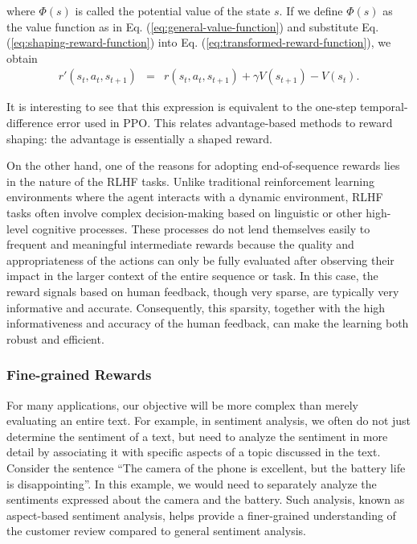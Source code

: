 \noindent where $\Phi(s)$ is called the potential value of the state $s$. If we define $\Phi(s)$ as the value function as in Eq. (\ref{eq:general-value-function}) and substitute Eq. (\ref{eq:shaping-reward-function}) into Eq. (\ref{eq:transformed-reward-function}), we obtain
\begin{eqnarray}
r'(s_t,a_t,s_{t+1}) & = & r(s_t,a_t,s_{t+1}) + \gamma V(s_{t+1}) - V(s_t).
\end{eqnarray}

\noindent It is interesting to see that this expression is equivalent to the one-step temporal-difference error used in PPO. This relates advantage-based methods to reward shaping: the advantage is essentially a shaped reward.

On the other hand, one of the reasons for adopting end-of-sequence rewards lies in the nature of the RLHF tasks. Unlike traditional reinforcement learning environments where the agent interacts with a dynamic environment, RLHF tasks often involve complex decision-making based on linguistic or other high-level cognitive processes. These processes do not lend themselves easily to frequent and meaningful intermediate rewards because the quality and appropriateness of the actions can only be fully evaluated after observing their impact in the larger context of the entire sequence or task. In this case, the reward signals based on human feedback, though very sparse, are typically very informative and accurate. Consequently, this sparsity, together with the high informativeness and accuracy of the human feedback, can make the learning both robust and efficient.

\subsubsection{Fine-grained Rewards}
\label{sec:fine-grained-rewards}

\noindent For many applications, our objective will be more complex than merely evaluating an entire text. For example, in sentiment analysis, we often do not just determine the sentiment of a text, but need to analyze the sentiment in more detail by associating it with specific aspects of a topic discussed in the text. Consider the sentence ``The camera of the phone is excellent, but the battery life is disappointing''. In this example, we would need to separately analyze the sentiments expressed about the camera and the battery. Such analysis, known as aspect-based sentiment analysis, helps provide a finer-grained understanding of the customer review compared to general sentiment analysis.

